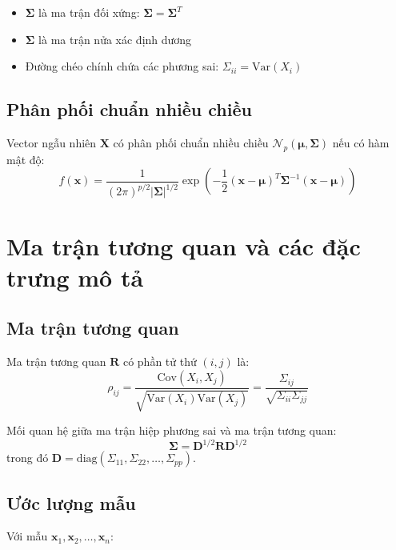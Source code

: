 \begin{tinhchat}
\begin{itemize}
    \item $\boldsymbol{\Sigma}$ là ma trận đối xứng: $\boldsymbol{\Sigma} = \boldsymbol{\Sigma}^T$
    \item $\boldsymbol{\Sigma}$ là ma trận nửa xác định dương
    \item Đường chéo chính chứa các phương sai: $\Sigma_{ii} = \text{Var}(X_i)$
\end{itemize}
\end{tinhchat}

\subsection{Phân phối chuẩn nhiều chiều}
\begin{dn}
Vector ngẫu nhiên $\mathbf{X}$ có phân phối chuẩn nhiều chiều $\mathcal{N}_p(\boldsymbol{\mu}, \boldsymbol{\Sigma})$ nếu có hàm mật độ:
\[
f(\mathbf{x}) = \frac{1}{(2\pi)^{p/2}|\boldsymbol{\Sigma}|^{1/2}} \exp\left(-\frac{1}{2}(\mathbf{x} - \boldsymbol{\mu})^T\boldsymbol{\Sigma}^{-1}(\mathbf{x} - \boldsymbol{\mu})\right)
\]
\end{dn}

\section{Ma trận tương quan và các đặc trưng mô tả}

\subsection{Ma trận tương quan}
\begin{dn}
Ma trận tương quan $\mathbf{R}$ có phần tử thứ $(i,j)$ là:
\[
\rho_{ij} = \frac{\text{Cov}(X_i, X_j)}{\sqrt{\text{Var}(X_i)\text{Var}(X_j)}} = \frac{\Sigma_{ij}}{\sqrt{\Sigma_{ii}\Sigma_{jj}}}
\]
\end{dn}

Mối quan hệ giữa ma trận hiệp phương sai và ma trận tương quan:
\[
\boldsymbol{\Sigma} = \mathbf{D}^{1/2} \mathbf{R} \mathbf{D}^{1/2}
\]
trong đó $\mathbf{D} = \text{diag}(\Sigma_{11}, \Sigma_{22}, \ldots, \Sigma_{pp})$.

\subsection{Ước lượng mẫu}
Với mẫu $\mathbf{x}_1, \mathbf{x}_2, \ldots, \mathbf{x}_n$:

